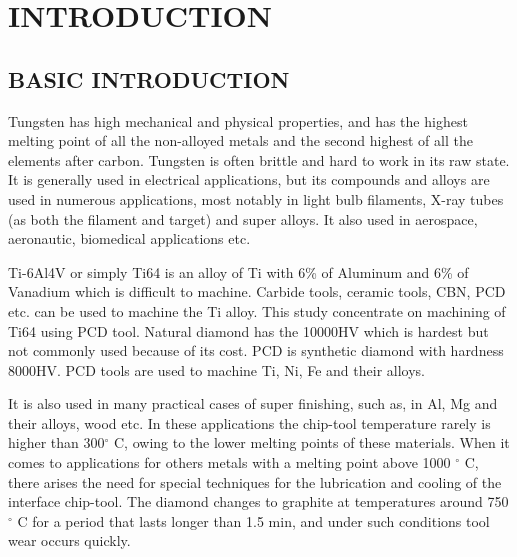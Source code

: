 \chapter{INTRODUCTION}
\section{BASIC INTRODUCTION}
Tungsten has high mechanical and physical properties, and has the highest melting point of all the non-alloyed metals and the second highest of all the elements after carbon. Tungsten is often brittle and hard to work in its raw state. It is generally used in electrical applications, but its compounds and alloys are used in numerous applications, most notably in light bulb filaments, X-ray tubes (as both the filament and target) and super alloys. It also used in aerospace, aeronautic, biomedical applications etc.

Ti-6Al4V or simply Ti64 is an alloy of Ti with 6\% of Aluminum and 6\% of Vanadium which is difficult to machine. Carbide tools, ceramic tools, CBN, PCD etc. can be used to machine the Ti alloy. This study concentrate on machining of Ti64 using PCD tool. Natural diamond has the 10000HV which is hardest but not commonly used because of its cost. PCD is synthetic diamond with hardness 8000HV. PCD tools are used to machine Ti, Ni, Fe and their alloys.

It is also used in many practical cases of super finishing, such as, in Al, Mg and their alloys, wood etc. In these applications the chip-tool temperature rarely is higher than 300$^\circ$ C, owing to the lower melting points of these materials. When it comes to applications for others metals with a melting point above 1000 $^\circ$ C, there arises the need for special techniques for the lubrication and cooling of the interface chip-tool. The diamond  changes to graphite  at temperatures around 750$^\circ$ C for a period that lasts longer than 1.5 min, and under such conditions tool wear occurs quickly.

